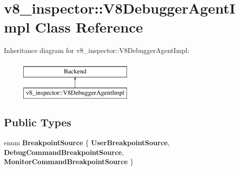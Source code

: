 \hypertarget{classv8__inspector_1_1V8DebuggerAgentImpl}{}\section{v8\+\_\+inspector\+:\+:V8\+Debugger\+Agent\+Impl Class Reference}
\label{classv8__inspector_1_1V8DebuggerAgentImpl}
Inheritance diagram for v8\+\_\+inspector\+:\+:V8\+Debugger\+Agent\+Impl\+:\begin{figure}[H]
\begin{center}
\leavevmode
\includegraphics[height=2.000000cm]{classv8__inspector_1_1V8DebuggerAgentImpl}
\end{center}
\end{figure}
\subsection*{Public Types}
\begin{DoxyCompactItemize}
\item 
\mbox{\label{classv8__inspector_1_1V8DebuggerAgentImpl_a6c9ddd65aab7f8ec1599ba87cb30a324}} 
enum {\bfseries Breakpoint\+Source} \{ {\bfseries User\+Breakpoint\+Source}, 
{\bfseries Debug\+Command\+Breakpoint\+Source}, 
{\bfseries Monitor\+Command\+Breakpoint\+Source}
 \}
\end{DoxyCompactItemize}
